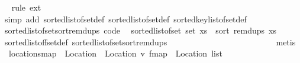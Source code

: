 \begin{isabellebody}
%
\isadelimproof
\ \ %
\endisadelimproof
%
\isatagproof
{}\isamarkupfalse%
{\isacharparenleft}{\kern0pt}rule\ ext{\isacharparenright}{\kern0pt}\isanewline
\ \ \isamarkupfalse%
\ {\isacharparenleft}{\kern0pt}simp\ add{\isacharcolon}{\kern0pt}\ sorted{\isacharunderscore}{\kern0pt}list{\isacharunderscore}{\kern0pt}of{\isacharunderscore}{\kern0pt}set{\isacharprime}{\kern0pt}{\isacharunderscore}{\kern0pt}def\ sorted{\isacharunderscore}{\kern0pt}list{\isacharunderscore}{\kern0pt}of{\isacharunderscore}{\kern0pt}set{\isacharunderscore}{\kern0pt}def\ sorted{\isacharunderscore}{\kern0pt}key{\isacharunderscore}{\kern0pt}list{\isacharunderscore}{\kern0pt}of{\isacharunderscore}{\kern0pt}set{\isacharunderscore}{\kern0pt}def{\isacharparenright}{\kern0pt}%
\endisatagproof
{\isafoldproof}%
%
\isadelimproof
\isanewline
%
\endisadelimproof
\isanewline
{}\isamarkupfalse%
\ sorted{\isacharunderscore}{\kern0pt}list{\isacharunderscore}{\kern0pt}of{\isacharunderscore}{\kern0pt}set{\isacharunderscore}{\kern0pt}sort{\isacharunderscore}{\kern0pt}remdups{\isacharprime}{\kern0pt}\ {\isacharbrackleft}{\kern0pt}code{\isacharbrackright}{\kern0pt}{\isacharcolon}{\kern0pt}\isanewline
\ \ {\isacartoucheopen}sorted{\isacharunderscore}{\kern0pt}list{\isacharunderscore}{\kern0pt}of{\isacharunderscore}{\kern0pt}set{\isacharprime}{\kern0pt}\ {\isacharparenleft}{\kern0pt}set\ xs{\isacharparenright}{\kern0pt}\ {\isacharequal}{\kern0pt}\ sort\ {\isacharparenleft}{\kern0pt}remdups\ xs{\isacharparenright}{\kern0pt}{\isacartoucheclose}\isanewline
%
\isadelimproof
\ \ %
\endisadelimproof
%
\isatagproof
{}\isamarkupfalse%
\ sorted{\isacharunderscore}{\kern0pt}list{\isacharunderscore}{\kern0pt}of{\isacharunderscore}{\kern0pt}fset{\isacharprime}{\kern0pt}{\isacharunderscore}{\kern0pt}def{\isacharprime}{\kern0pt}\ sorted{\isacharunderscore}{\kern0pt}list{\isacharunderscore}{\kern0pt}of{\isacharunderscore}{\kern0pt}set{\isacharunderscore}{\kern0pt}sort{\isacharunderscore}{\kern0pt}remdups\ \ \ \ \ \ \ \ \ \ \ \ \ \ \ \ \ \ \ \ \ \ \isanewline
\ \ \isamarkupfalse%
\ metis%
\endisatagproof
{\isafoldproof}%
%
\isadelimproof
\isanewline
%
\endisadelimproof
\isanewline
{}\isamarkupfalse%
\ \ locations{\isacharunderscore}{\kern0pt}map\ {\isacharcolon}{\kern0pt}{\isacharcolon}{\kern0pt}\ {\isachardoublequoteopen}Location\ {\isasymRightarrow}\ {\isacharparenleft}{\kern0pt}Location{\isacharcomma}{\kern0pt}\ {\isacharprime}{\kern0pt}v{\isacharparenright}{\kern0pt}\ fmap\ {\isasymRightarrow}\ Location\ list{\isachardoublequoteclose}\ \isanewline

\end{isabellebody}
